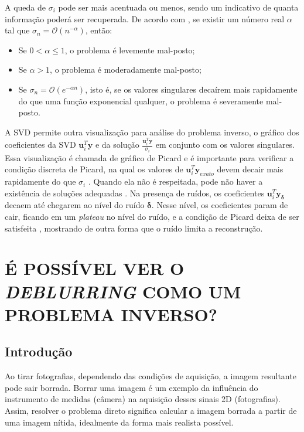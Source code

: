 A queda de  $\sigma_i$ pode ser mais acentuada ou menos, sendo um indicativo de quanta informação poderá ser recuperada. De acordo com \cite[Definição 3.3.2]{Mueller2012}, se existir um número real $\alpha$ tal que $\sigma_n = \mathcal{O}(n^{-\alpha})$, então:
\begin{itemize}

    \item Se $0<\alpha\leq1$, o problema é levemente mal-posto;
    \item Se $\alpha>1$, o problema é moderadamente mal-posto;
    \item  Se $\sigma_n = \mathcal{O}(e^{-\alpha n})$, isto é, se os valores singulares decaírem mais rapidamente do que uma função exponencial qualquer, o problema é severamente mal-posto.
\end{itemize} 
A SVD permite outra visualização para análise do problema inverso, o gráfico dos coeficientes da SVD $\mathbf{u}_i^T \mathbf{y}$ e da solução $\frac{\mathbf{u}_i^T \mathbf{y}}{\sigma_i}$ em conjunto com os valores singulares. Essa visualização é chamada de gráfico de Picard e é importante para verificar a condição discreta de Picard, na qual os valores de $\mathbf{u}_i^T \mathbf{y}_{exato}$ devem decair mais rapidamente do que $\sigma_i$ \cite[pág. 37]{hansen2010discrete}. Quando ela não é respeitada, pode não haver a existência de soluções adequadas \cite[pág. 47]{hansen2010discrete}. Na presença de ruídos, os coeficientes $\mathbf{u}_i^T \mathbf{y}_{\bm{\delta}}$ decaem até chegarem ao nível do ruído $\bm{\delta}$. Nesse nível, os coeficientes param de cair, ficando em um \textit{plateau} no nível do ruído, e a condição de Picard deixa de ser satisfeita \cite[pág. 12]{hansen2010discrete}, mostrando de outra forma que o ruído limita a reconstrução.


\newpage
\section{É POSSÍVEL VER O \textit{DEBLURRING} COMO UM PROBLEMA INVERSO?}\label{sec:deblur_forward}

\subsection{Introdução}
Ao tirar fotografias, dependendo das condições de aquisição, a imagem resultante pode sair borrada. Borrar uma imagem é um exemplo da influência do instrumento de medidas (câmera) na aquisição desses sinais 2D (fotografias). Assim, resolver o problema direto significa calcular a imagem borrada a partir de uma imagem nítida, idealmente da forma mais realista possível. 

